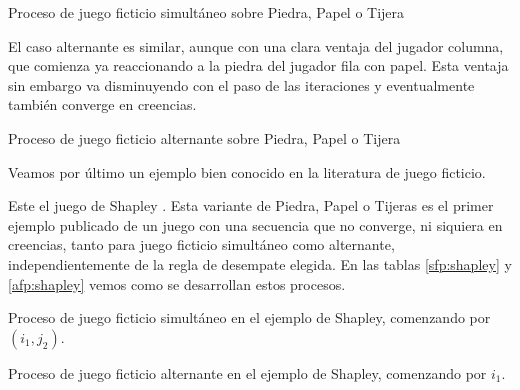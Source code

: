 \begin{table} %
    \centering
    
    \caption{Proceso de juego ficticio simultáneo sobre Piedra, Papel o Tijera}
    \label{sfp:piedra:papel:tijera}
\end{table}

El caso alternante es similar, aunque con una clara ventaja del jugador columna, que comienza ya reaccionando a la piedra del jugador fila con papel. Esta ventaja sin embargo va disminuyendo con el paso de las iteraciones y eventualmente también converge en creencias.


\begin{table} %
    \centering
    
    \caption{Proceso de juego ficticio alternante sobre Piedra, Papel o Tijera}
    \label{afp:piedra:papel:tijera}
\end{table}

Veamos por último un ejemplo bien conocido en la literatura de juego ficticio.



Este el juego de Shapley \cite{shapley:3x3}. Esta variante de Piedra, Papel o Tijeras es el primer ejemplo publicado de un juego con una secuencia que no converge, ni siquiera en creencias, tanto para juego ficticio simultáneo como alternante, independientemente de la regla de desempate elegida. En las tablas \ref{sfp:shapley} y \ref{afp:shapley} vemos como se desarrollan estos procesos.


\begin{table} %
    \centering
    
    \caption{Proceso de juego ficticio simultáneo en el ejemplo de Shapley, comenzando por $(i_1, j_2)$.}
    \label{sfp:shapley}
\end{table}
\begin{table} %
    \centering
    
    \caption{Proceso de juego ficticio alternante en el ejemplo de Shapley, comenzando por $i_1$.}
    \label{afp:shapley}
\end{table}

